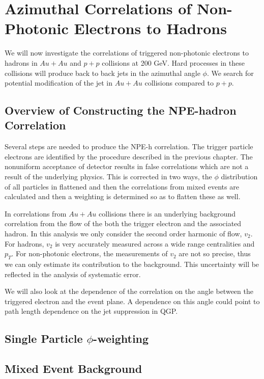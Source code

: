 \chapter{Azimuthal Correlations of Non-Photonic Electrons to Hadrons}

We will now investigate the correlations of triggered non-photonic electrons to hadrons in $Au+Au$ and $p+p$ collisions at 200 GeV. Hard processes in these collisions will produce back to back jets in the azimuthal angle $\phi$. We search for potential modification of the jet in $Au+Au$ collisions compared to $p+p$. 

\section{Overview of Constructing the NPE-hadron Correlation}

Several steps are needed to produce the NPE-h correlation. The trigger particle electrons are identified by the procedure described in the previous chapter. The nonuniform acceptance of detector results in false correlations which are not a result of the underlying physics. This is corrected in two ways, the $\phi$ distribution of all particles in flattened and then the correlations from mixed events are calculated and then a weighting is determined so as to flatten these as well.

In correlations from $Au+Au$ collisions there is an underlying background correlation from the flow of the both the trigger electron and the associated hadron. In this analysis we only consider the second order harmonic of flow, $v_{2}$. For hadrons, $v_{2}$ is very accurately measured across a wide range centralities and $p_{T}$. For non-photonic electrons, the measurements of $v_{2}$ are not so precise, thus we can only estimate its contribution to the background. This uncertainty will be reflected in the analysis of systematic error.

We will also look at the dependence of the correlation on the angle between the triggered electron and the event plane. A dependence on this angle could point to path length dependence on the jet suppression in QGP.

\section{Single Particle $\phi$-weighting}



\section{Mixed Event Background}

